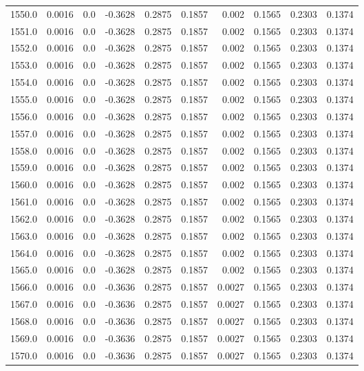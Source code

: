 \begin{longtable}{lrrrrrrrrr}
1550.0 & 0.0016 & 0.0 & -0.3628 & 0.2875 & 0.1857 & 0.002 & 0.1565 & 0.2303 & 0.1374 \\
1551.0 & 0.0016 & 0.0 & -0.3628 & 0.2875 & 0.1857 & 0.002 & 0.1565 & 0.2303 & 0.1374 \\
1552.0 & 0.0016 & 0.0 & -0.3628 & 0.2875 & 0.1857 & 0.002 & 0.1565 & 0.2303 & 0.1374 \\
1553.0 & 0.0016 & 0.0 & -0.3628 & 0.2875 & 0.1857 & 0.002 & 0.1565 & 0.2303 & 0.1374 \\
1554.0 & 0.0016 & 0.0 & -0.3628 & 0.2875 & 0.1857 & 0.002 & 0.1565 & 0.2303 & 0.1374 \\
1555.0 & 0.0016 & 0.0 & -0.3628 & 0.2875 & 0.1857 & 0.002 & 0.1565 & 0.2303 & 0.1374 \\
1556.0 & 0.0016 & 0.0 & -0.3628 & 0.2875 & 0.1857 & 0.002 & 0.1565 & 0.2303 & 0.1374 \\
1557.0 & 0.0016 & 0.0 & -0.3628 & 0.2875 & 0.1857 & 0.002 & 0.1565 & 0.2303 & 0.1374 \\
1558.0 & 0.0016 & 0.0 & -0.3628 & 0.2875 & 0.1857 & 0.002 & 0.1565 & 0.2303 & 0.1374 \\
1559.0 & 0.0016 & 0.0 & -0.3628 & 0.2875 & 0.1857 & 0.002 & 0.1565 & 0.2303 & 0.1374 \\
1560.0 & 0.0016 & 0.0 & -0.3628 & 0.2875 & 0.1857 & 0.002 & 0.1565 & 0.2303 & 0.1374 \\
1561.0 & 0.0016 & 0.0 & -0.3628 & 0.2875 & 0.1857 & 0.002 & 0.1565 & 0.2303 & 0.1374 \\
1562.0 & 0.0016 & 0.0 & -0.3628 & 0.2875 & 0.1857 & 0.002 & 0.1565 & 0.2303 & 0.1374 \\
1563.0 & 0.0016 & 0.0 & -0.3628 & 0.2875 & 0.1857 & 0.002 & 0.1565 & 0.2303 & 0.1374 \\
1564.0 & 0.0016 & 0.0 & -0.3628 & 0.2875 & 0.1857 & 0.002 & 0.1565 & 0.2303 & 0.1374 \\
1565.0 & 0.0016 & 0.0 & -0.3628 & 0.2875 & 0.1857 & 0.002 & 0.1565 & 0.2303 & 0.1374 \\
1566.0 & 0.0016 & 0.0 & -0.3636 & 0.2875 & 0.1857 & 0.0027 & 0.1565 & 0.2303 & 0.1374 \\
1567.0 & 0.0016 & 0.0 & -0.3636 & 0.2875 & 0.1857 & 0.0027 & 0.1565 & 0.2303 & 0.1374 \\
1568.0 & 0.0016 & 0.0 & -0.3636 & 0.2875 & 0.1857 & 0.0027 & 0.1565 & 0.2303 & 0.1374 \\
1569.0 & 0.0016 & 0.0 & -0.3636 & 0.2875 & 0.1857 & 0.0027 & 0.1565 & 0.2303 & 0.1374 \\
1570.0 & 0.0016 & 0.0 & -0.3636 & 0.2875 & 0.1857 & 0.0027 & 0.1565 & 0.2303 & 0.1374 \\

\end{longtable}
